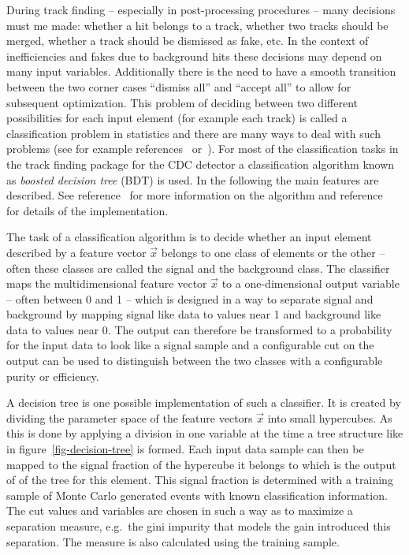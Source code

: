 During track finding -- especially in post-processing procedures -- many decisions must me made: whether a hit belongs to a track, whether two tracks should be merged, whether a track should be dismissed as fake, etc. In the context of inefficiencies and fakes due to background hits these decisions may depend on many input variables. Additionally there is the need to have a smooth transition between the two corner cases ``dismiss all'' and ``accept all'' to allow for subsequent optimization. This problem of deciding between two different possibilities for each input element (for example each track) is called a classification problem in statistics and there are many ways to deal with such problems (see for example references~\cite{cowan} or~\cite{blobel}). For most of the classification tasks in the track finding package for the CDC detector a classification algorithm known as \emph{boosted decision tree} (BDT) is used. In the following the main features are described. See reference~\cite{friedman} for more information on the algorithm and reference~\cite{keck} for details of the implementation.

The task of a classification algorithm is to decide whether an input element described by a feature vector $\vec x$ belongs to one class of elements or the other -- often these classes are called the signal and the background class. The classifier maps the multidimensional feature vector $\vec x$ to a one-dimensional output variable -- often between 0 and 1 -- which is designed in a way to separate signal and background by mapping signal like data to values near 1 and background like data to values near 0. The output can therefore be transformed to a probability for the input data to look like a signal sample and a configurable cut on the output can be used to distinguish between the two classes with a configurable purity or efficiency.

A decision tree is one possible implementation of such a classifier. It is created by dividing the parameter space of the feature vectors $\vec x$ into small hypercubes. As this is done by applying a division in one variable at the time a tree structure like in figure~\ref{fig-decision-tree} is formed. Each input data sample can then be mapped to the signal fraction of the hypercube it belongs to which is the output of of the tree for this element. This signal fraction is determined with a training sample of Monte Carlo generated events with known classification information. The cut values and variables are chosen in such a way as to maximize a separation measure, e.g.\ the gini impurity that models the gain introduced this separation. The measure is also calculated using the training sample.

